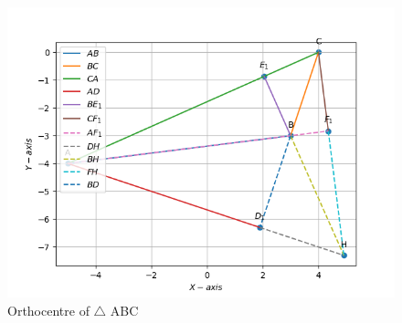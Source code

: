 \documentclass[10pt]{book}
\begin{document}
\begin{figure}[H]
    \centering
    \includegraphics{figs/H_intersection.png}
    \caption{Orthocentre of $\triangle$ ABC}
    \label{fig:H_intersection}
\end{figure}
\end{document}
